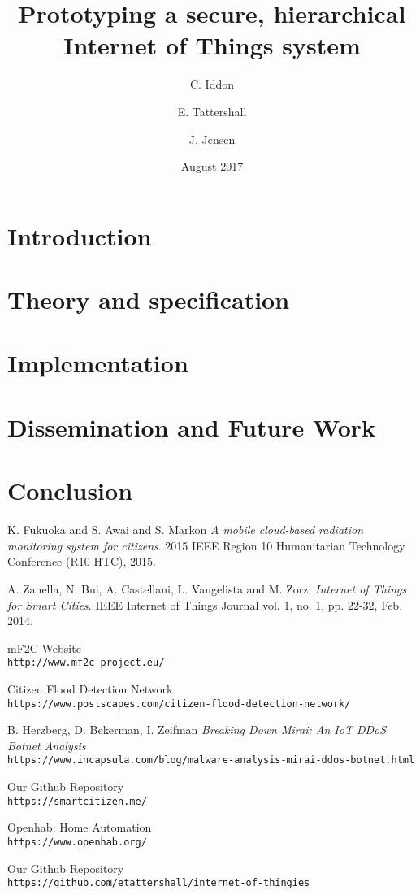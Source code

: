 \documentclass{article}
\title{Prototyping a secure, hierarchical Internet of Things system}
\author{
  C. Iddon
  \and
  E. Tattershall
  \and
  J. Jensen
}
\date{August 2017}
\begin{document}
\maketitle

\section{Introduction}


\section{Theory and specification}


\section{Implementation}


\section{Dissemination and Future Work}


\section{Conclusion}


\begin{thebibliography}{9}
K. Fukuoka and S. Awai and S. Markon 
\textit{A mobile cloud-based radiation monitoring system for citizens}. 
2015 IEEE Region 10 Humanitarian Technology Conference (R10-HTC), 2015.

A. Zanella, N. Bui, A. Castellani, L. Vangelista and M. Zorzi
\textit{Internet of Things for Smart Cities}. 
IEEE Internet of Things Journal vol. 1, no. 1, pp. 22-32, Feb. 2014.

mF2C Website
\\\texttt{http://www.mf2c-project.eu/}

Citizen Flood Detection Network
\\\texttt{https://www.postscapes.com/citizen-flood-detection-network/}

B. Herzberg, D. Bekerman, I. Zeifman
\textit{Breaking Down Mirai: An IoT DDoS Botnet Analysis}
\\\texttt{https://www.incapsula.com/blog/malware-analysis-mirai-ddos-botnet.html}

Our Github Repository
\\\texttt{https://smartcitizen.me/}

Openhab: Home Automation
\\\texttt{https://www.openhab.org/}

Our Github Repository
\\\texttt{https://github.com/etattershall/internet-of-thingies}

\end{thebibliography}
\end{document}

